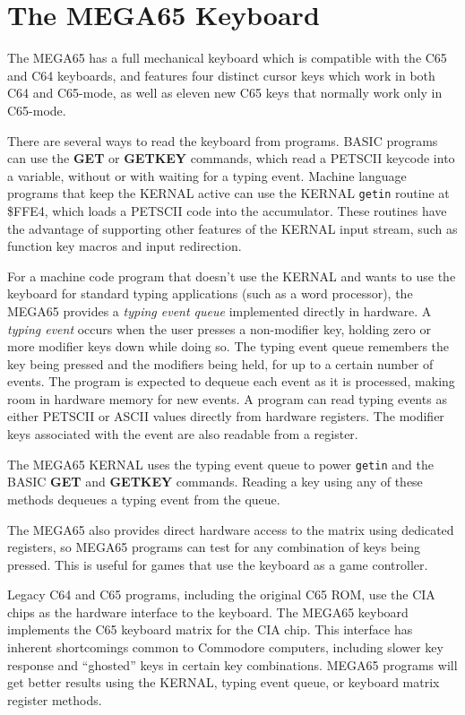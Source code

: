 
\chapter{The MEGA65 Keyboard}
\label{cha:keyboard}

The MEGA65 has a full mechanical keyboard which is compatible with the C65 and C64 keyboards, and features four distinct cursor keys which work in both C64 and C65-mode, as well as eleven new C65 keys that normally work only in
C65-mode.

There are several ways to read the keyboard from programs. BASIC programs can use the {\bf GET} or {\bf GETKEY} commands, which read a PETSCII keycode into a variable, without or with waiting for a typing event. Machine language programs that keep the KERNAL active can use the KERNAL {\tt getin} routine at \$FFE4, which loads a PETSCII code into the accumulator. These routines have the advantage of supporting other features of the KERNAL input stream, such as function key macros and input redirection.

For a machine code program that doesn't use the KERNAL and wants to use the keyboard for standard typing applications (such as a word processor), the MEGA65 provides a {\em typing event queue} implemented directly in hardware. A {\em typing event} occurs when the user presses a non-modifier key, holding zero or more modifier keys down while doing so. The typing event queue remembers the key being pressed and the modifiers being held, for up to a certain number of events. The program is expected to dequeue each event as it is processed, making room in hardware memory for new events. A program can read typing events as either PETSCII or ASCII values directly from hardware registers. The modifier keys associated with the event are also readable from a register.

The MEGA65 KERNAL uses the typing event queue to power {\tt getin} and the BASIC {\bf GET} and {\bf GETKEY} commands. Reading a key using any of these methods dequeues a typing event from the queue.

The MEGA65 also provides direct hardware access to the matrix using dedicated registers, so MEGA65 programs can test for any combination of keys being pressed. This is useful for games that use the keyboard as a game controller.

Legacy C64 and C65 programs, including the original C65 ROM, use the CIA chips as the hardware interface to the keyboard. The MEGA65 keyboard implements the C65 keyboard matrix for the CIA chip. This interface has inherent shortcomings common to Commodore computers, including slower key response and ``ghosted'' keys in certain key combinations. MEGA65 programs will get better results using the KERNAL, typing event queue, or keyboard matrix register methods.

